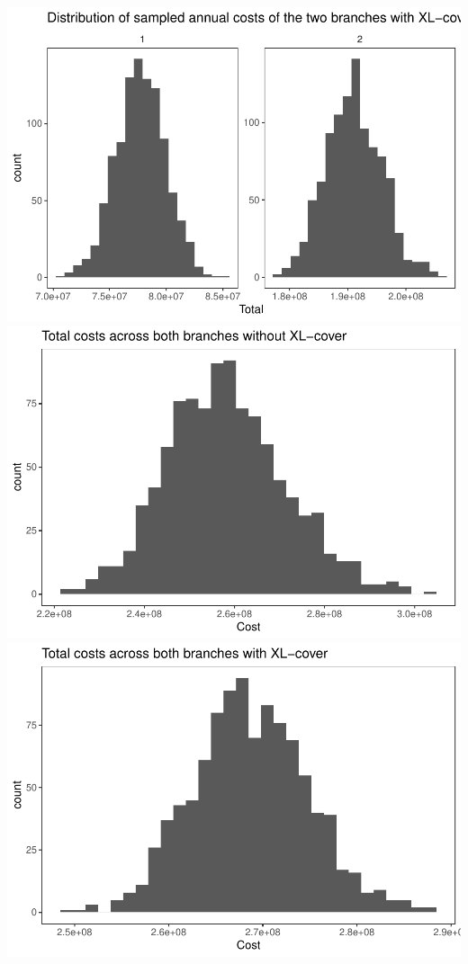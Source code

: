 \documentclass[]{article}
\begin{document}
\includegraphics{Projekt1_files/figure-latex/unnamed-chunk-14-1.pdf}
\includegraphics{Projekt1_files/figure-latex/unnamed-chunk-14-2.pdf}
\includegraphics{Projekt1_files/figure-latex/unnamed-chunk-14-3.pdf}
\end{document}
